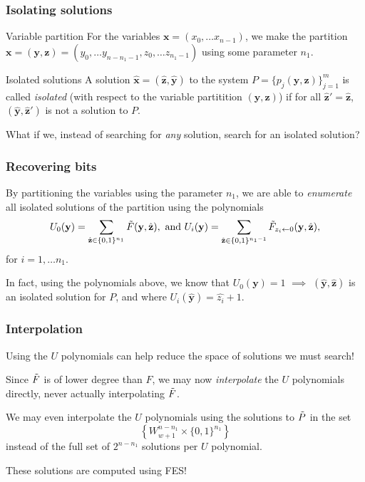 \documentclass{beamer}
\begin{document}
\begin{frame}
    \frametitle{Isolating solutions}
    \begin{block}{Variable partition}
        For the variables $\mathbf{x} = (x_0, \dots x_{n - 1})$, we make the partition $\mathbf{x} = (\mathbf{y}, \mathbf{z}) = (y_0, \dots y_{n - n_1 - 1}, z_{0}, \dots z_{n_1 - 1})$ using some parameter $n_1$.
    \end{block}

    \begin{alertblock}{Isolated solutions}
        A solution $\hat{\mathbf{x}} = (\hat{\mathbf{z}}, \hat{\mathbf{y}})$ to the system $P = \{p_j(\mathbf{y}, \mathbf{z})\}^m_{j = 1}$ is called \textit{isolated} (with respect to the variable partitition $(\mathbf{y}, \mathbf{z})$) if for all $\hat{\mathbf{z}}'=\hat{\mathbf{z}}$, $(\hat{\mathbf{y}}, \hat{\mathbf{z}}')$ is not a solution to $P$.
    \end{alertblock}
    What if we, instead of searching for \textit{any} solution, search for an isolated solution? 
\end{frame}

\begin{frame}
    \frametitle{Recovering bits}
        By partitioning the variables using the parameter $n_1$, we are able to \textit{enumerate} all isolated solutions of the partition using the polynomials
        $$
            U_0(\mathbf{y}) = \sum_{\hat{\mathbf{z}} \in \{0,1\}^{n_1}} \Tilde{F}(\mathbf{y},\hat{\mathbf{z}}), \text{ and } U_i(\mathbf{y}) = \sum_{\hat{\mathbf{z}}\in \{0,1\}^{n_1 - 1}} \Tilde{F}_{z_i \leftarrow 0}(\mathbf{y}, \hat{\mathbf{z}}),
        $$
        for $i = 1, \dots n_1$. \pause

        In fact, using the polynomials above, we know that $U_0(\mathbf{y}) = 1$ $\implies$ $(\hat{\mathbf{y}}, \hat{\mathbf{z}})$ is an isolated solution for $P$, and where $U_i(\hat{\mathbf{y}}) = \hat{z_i} + 1$.
\end{frame}

\begin{frame}
    \frametitle{Interpolation}
    Using the $U$ polynomials can help reduce the space of solutions we must search!

    \pause

    Since $\Tilde{F}$ is of lower degree than $F$, we may now \textit{interpolate} the $U$ polynomials directly, never actually interpolating $\Tilde{F}$.

    \pause 

    We may even interpolate the $U$ polynomials using the solutions to $\Tilde{P}$ in the set 
    $$
        \left\{ W_{w + 1}^{n - n_1} \times \{0,1\}^{n_1} \right\}
    $$
    instead of the full set of $2^{n - n_1}$ solutions per $U$ polynomial. 
    
    \pause

    These solutions are computed using FES!
\end{frame}
\end{document}
